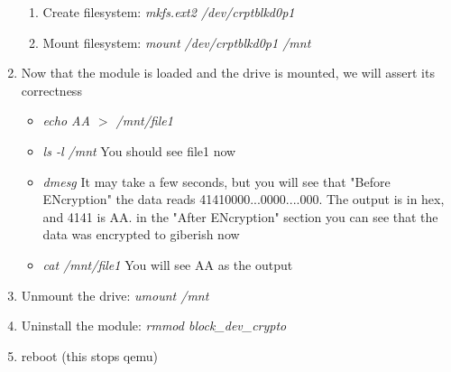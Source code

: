 \documentclass[draftclsnofoot, onecolumn, 10pt, compsoc]{IEEEtran}
\begin{document}
\begin{enumerate}
\begin{enumerate}
					\item Create filesystem: \textit{mkfs.ext2 /dev/crptblkd0p1}
					
					\item Mount filesystem: \textit{mount /dev/crptblkd0p1 /mnt}
				\end{enumerate}
				
				\item Now that the module is loaded and the drive is mounted, we will assert its correctness
				\begin{itemize}
					\item \textit{echo AA $>$ /mnt/file1}
				
					\item \textit{ls -l /mnt} You should see file1 now
				
					\item 
						\textit{dmesg} It may take a few seconds, but you will see that "Before ENcryption" the data reads 41410000...0000....000. 
						The output is in hex, and 4141 is AA.
						in the "After ENcryption" section you can see that the data was encrypted to giberish now
					
					\item \textit{cat /mnt/file1} You will see AA as the output
				\end{itemize}
				
				\item Unmount the drive: \textit{umount /mnt}
				
				\item Uninstall the module: \textit{rmmod block\_dev\_crypto}
				
				\item reboot (this stops qemu)
			\end{enumerate}
\end{document}

